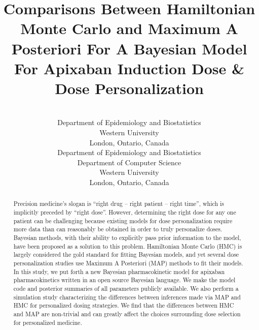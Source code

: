 \documentclass[pmlr]{jmlr}%
\title[Comparisons Between HMC and MAP For Personalized Medicine]{Comparisons Between Hamiltonian Monte Carlo and Maximum A Posteriori For A Bayesian Model For Apixaban Induction Dose \& Dose Personalization}
\author{\Name{A. Demetri Pananos}
       \Email{apananos@uwo.ca}\\ 
       \addr Department of Epidemiology and Biostatistics\\
       Western University\\
		London, Ontario, Canada
       \AND
       \Name{Daniel J. Lizotte}
       \Email{dlizotte@uwo.ca}\\ 
       \addr Department of Epidemiology and Biostatistics\\
       Department of Computer Science\\
       Western University\\
       London, Ontario, Canada}
\begin{document}
\maketitle

\begin{abstract}
Precision medicine’s slogan is “right drug -- right patient -- right time”, which is implicitly preceded by ``right dose''. However, determining the right dose for any one patient can be challenging because existing models for dose personalization require more data than can reasonably be obtained in order to truly personalize doses.  Bayesian methods, with their ability to explicitly pass prior information to the model, have been proposed as a solution to this problem. Hamiltonian Monte Carlo (HMC) is largely considered the gold standard for fitting Bayesian models, and yet several dose personalization studies use Maximum A Posteriori (MAP) methods to fit their models.  In this study, we put forth a new Bayesian pharmacokinetic model for apixaban pharmacokinetics written in an open source Bayesian language.  We make the model code and posterior summaries of all parameters publicly available. We also perform a simulation study characterizing the differences between inferences made via MAP and HMC for personalized dosing strategies. We find that the differences between HMC and MAP are non-trivial and can greatly affect the choices surrounding dose selection for personalized medicine.

\end{abstract}







\end{document}
